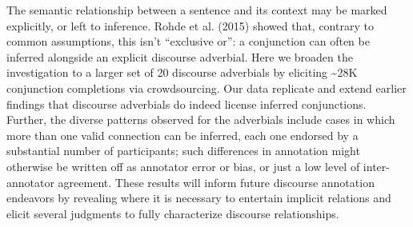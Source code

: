 The semantic relationship between a sentence and its context may be marked explicitly, or left to inference. Rohde et al. (2015) showed that, contrary to common assumptions, this isn't ``exclusive or'': a conjunction can often be inferred alongside an explicit discourse adverbial. Here we broaden the investigation to a larger set of 20 discourse adverbials by eliciting {\textasciitilde}28K conjunction completions via crowdsourcing. Our data replicate and extend earlier findings that discourse adverbials do indeed license inferred conjunctions. Further, the diverse patterns observed for the adverbials include cases in which more than one valid connection can be inferred, each one endorsed by a substantial number of participants; such differences in annotation might otherwise be written off as annotator error or bias, or just a low level of inter-annotator agreement. These results will inform future discourse annotation endeavors by revealing where it is necessary to entertain implicit relations and elicit several judgments to fully characterize discourse relationships.
